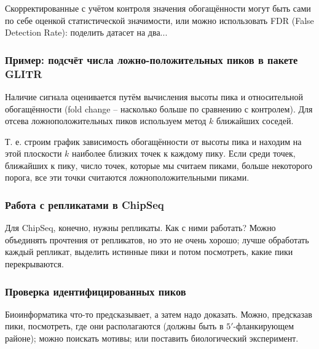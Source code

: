 \documentclass[main.tex]{subfiles}
\begin{document}
Скорректированные с учётом контроля значения обогащённости могут быть сами по себе оценкой статистической значимости, или можно использовать FDR (False Detection Rate): поделить датасет на два... %

\subsubsection{Пример: подсчёт числа ложно-положительных пиков в пакете GLITR}

Наличие сигнала оценивается путём вычисления высоты пика и относительной обогащённости (fold change -- насколько больше по сравнению с контролем).
Для отсева ложноположительных пиков используем метод $k$ ближайших соседей.

Т. е. строим график зависимость обогащённости от высоты пика и находим на этой плоскости $k$ наиболее близких точек к каждому пику.
Если среди точек, ближайших к пику, число точек, которые мы считаем пиками, больше некоторого порога, все эти точки считаются ложноположительными пиками.

\subsubsection{Работа с репликатами в ChipSeq}
Для ChipSeq, конечно, нужны репликаты. Как с ними работать?
Можно объединять прочтения от репликатов, но это не очень хорошо; лучше обработать каждый репликат, выделить истинные пики и потом посмотреть, какие пики перекрываются.

\subsubsection{ Проверка идентифицированных пиков }

Биоинформатика что-то предсказывает, а затем надо доказать.
Можно, предсказав пики, посмотреть, где они располагаются (должны быть в $5'$-фланкирующем районе); можно поискать мотивы; или поставить биологический эксперимент.
\end{document}
